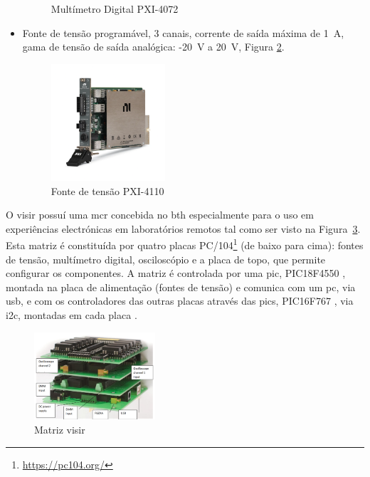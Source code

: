 \begin{itemize}
\begin{figure}[hbtp]
              \caption{Multímetro Digital PXI-4072 \cite{PXI-4072}}
              \label{fig:PXI-4072}
          \end{figure}
    \item Fonte de tensão programável, 3 canais, corrente de saída máxima de \SI{1}{\ampere}, gama de tensão de saída analógica: -\SI{20}{\volt} a \SI{20}{\volt}, Figura {\ref{fig:PXI-4110}}.
          \begin{figure}[hbtp]
              \centering
              \includegraphics[width=0.4\textwidth]{figures/PXI-4110.png}
              \caption{Fonte de tensão PXI-4110 \cite{PXI-4110}}
              \label{fig:PXI-4110}
          \end{figure}
\end{itemize}

O \acrshort{visir} possuí uma \acrfull{mcr} concebida no \acrshort{bth} especialmente para o uso em experiências electrónicas em laboratórios remotos tal como ser visto na Figura~\ref{fig:matrizvisir}. Esta matriz é constituída por quatro placas PC/104\footnote{\url{https://pc104.org/}} (de baixo para cima): fontes de tensão, multímetro digital, osciloscópio e a placa de topo, que permite configurar os componentes. A matriz é controlada por uma \acrfull{pic}, PIC18F4550 \cite{PIC18F4516datasheet}, montada na placa de alimentação (fontes de tensão) e comunica com um \acrshort{pc}, via \acrshort{usb}, e com os controladores das outras placas através das \acrshort{pic}s, PIC16F767 \cite{PIC16F7675datasheet}, via \acrfull{i2c}, montadas em cada placa \cite{matriz}.

\begin{figure}[hbtp]
    \centering
    \includegraphics[width=0.4\textwidth]{figures/matriz.png}
    \caption{Matriz \acrshort{visir}\cite{matriz}}
    \label{fig:matrizvisir}
\end{figure}

